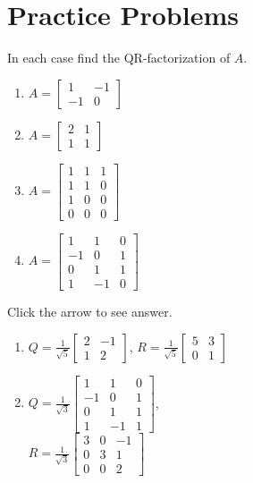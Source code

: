 \documentclass{ximera}
\begin{document}
\section*{Practice Problems}

\begin{problem}\label{prob:findQR}
In each case find the QR-factorization of $A$.

\begin{enumerate}
\item $A = \left[ \begin{array}{rr}
1 & -1 \\
-1 & 0
\end{array}\right]$
\item $A = \left[ \begin{array}{rr}
2 & 1 \\
1 &1
\end{array}\right]$
\item $A = \left[ \begin{array}{rrr}
1 & 1 & 1 \\
1 & 1 & 0 \\
1 & 0 & 0 \\
0 & 0 & 0
\end{array}\right]$
\item $A = \left[ \begin{array}{rrr}
1 & 1 & 0 \\
-1 & 0 & 1 \\
0 & 1 & 1 \\
1 & -1 & 0
\end{array}\right]$
\end{enumerate}
Click the arrow to see answer.
\begin{expandable}
\begin{enumerate} 
\item  $Q = \frac{1}{\sqrt{5}}\left[ \begin{array}{rr}
2 & -1 \\
1 & 2
\end{array}\right]$,
 $R = \frac{1}{\sqrt{5}}\left[ \begin{array}{rr}
5 & 3 \\
0 & 1
\end{array}\right]$

\item  $Q = \frac{1}{\sqrt{3}}\left[ \begin{array}{rrr}
1 & 1 & 0 \\
-1 & 0 & 1 \\
0 & 1 & 1 \\
1 & -1 & 1
\end{array}\right]$, \\
$R = \frac{1}{\sqrt{3}}\left[ \begin{array}{rrr}
3 & 0 & -1 \\
0 & 3 & 1 \\
0 & 0 & 2
\end{array}\right]$

\end{enumerate}
\end{expandable}
\end{problem}
\end{document}
